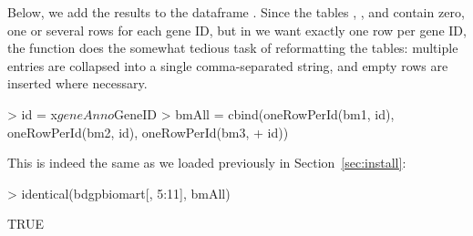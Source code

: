 %
Below, we add the results
to the dataframe . Since the tables ,
, and  contain zero, one or several rows for
each gene ID, but in  we want exactly one row per
gene ID, the function  does the somewhat tedious
task of reformatting the tables: multiple entries are collapsed
into a single comma-separated string, and empty rows are inserted
where necessary.
%
\begin{Schunk}
\begin{Sinput}
> id = x$geneAnno$GeneID
> bmAll = cbind(oneRowPerId(bm1, id), oneRowPerId(bm2, id), oneRowPerId(bm3, 
+     id))
\end{Sinput}
\end{Schunk}
%
This is indeed the same as we loaded previously in
Section~\ref{sec:install}:
%
\begin{Schunk}
\begin{Sinput}
> identical(bdgpbiomart[, 5:11], bmAll)
\end{Sinput}
\begin{Soutput}
[1] TRUE
\end{Soutput}
\end{Schunk}
%


